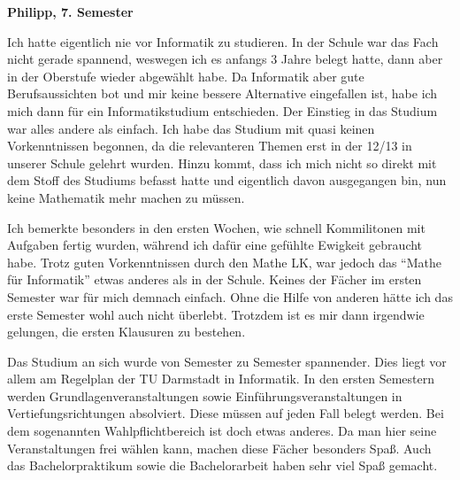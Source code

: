 {    \textbf{Philipp, 7. Semester}

    Ich hatte eigentlich nie vor Informatik zu studieren. In der Schule war das Fach nicht gerade spannend, weswegen ich es anfangs 3 Jahre belegt hatte, dann aber in der Oberstufe wieder abgewählt habe. Da Informatik aber gute Berufsaussichten bot und mir keine bessere Alternative eingefallen ist, habe ich mich dann für ein Informatikstudium entschieden. Der Einstieg in das Studium war alles andere als einfach. Ich habe das Studium mit quasi keinen Vorkenntnissen begonnen, da die relevanteren Themen erst in der 12/13 in unserer Schule gelehrt wurden. Hinzu kommt, dass ich mich nicht so direkt mit dem Stoff des Studiums befasst hatte und eigentlich davon ausgegangen bin, nun keine Mathematik mehr machen zu müssen.

    Ich bemerkte besonders in den ersten Wochen, wie schnell Kommilitonen mit Aufgaben fertig wurden, während ich dafür eine gefühlte Ewigkeit gebraucht habe. Trotz guten Vorkenntnissen durch den Mathe LK, war jedoch das "`Mathe für Informatik"' etwas anderes als in der Schule. Keines der Fächer im ersten Semester war für mich demnach einfach. Ohne die Hilfe von anderen hätte ich das erste Semester wohl auch nicht überlebt. Trotzdem ist es mir dann irgendwie gelungen, die ersten Klausuren zu bestehen.

    Das Studium an sich wurde von Semester zu Semester spannender. Dies liegt vor allem am Regelplan der TU Darmstadt in Informatik. In den ersten Semestern werden Grundlagenveranstaltungen sowie Einführungsveranstaltungen in Vertiefungsrichtungen absolviert. Diese müssen auf jeden Fall belegt werden. Bei dem sogenannten Wahlpflichtbereich ist doch etwas anderes. Da man hier seine Veranstaltungen frei wählen kann, machen diese Fächer besonders Spaß. Auch das Bachelorpraktikum sowie die Bachelorarbeit haben sehr viel Spaß gemacht.

}
